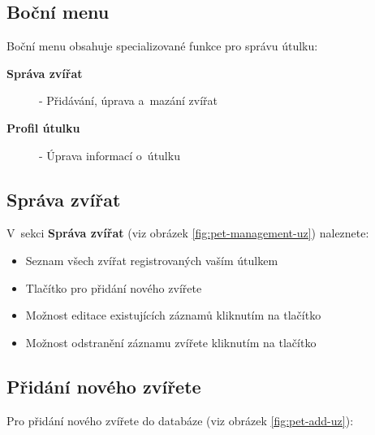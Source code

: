 \documentclass[czech, bp, kiv, he, iso690numb, pdf]{fasthesis}
\begin{document}
    \subsection*{Boční menu}

    Boční menu obsahuje specializované funkce pro správu útulku:

    \begin{description}
        \item[\textbf{Správa zvířat}] - Přidávání, úprava a~mazání zvířat
        \item[\textbf{Profil útulku}] - Úprava informací o~útulku
    \end{description}

    \subsection*{Správa zvířat}

    V~sekci \textbf{Správa zvířat} (viz obrázek \ref{fig:pet-management-uz}) naleznete:

    \begin{itemize}
        \item Seznam všech zvířat registrovaných vaším útulkem
        \item Tlačítko  pro přidání nového zvířete
        \item Možnost editace existujících záznamů kliknutím na tlačítko 
        \item Možnost odstranění záznamu zvířete kliknutím na tlačítko 
    \end{itemize}

    \subsection*{Přidání nového zvířete}

    Pro přidání nového zvířete do databáze (viz obrázek \ref{fig:pet-add-uz}):
\end{document}
